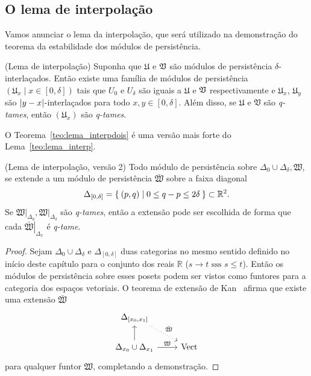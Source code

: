 \subsection{O lema de interpolação}

Vamos anunciar o lema da interpolação, que será utilizado na 
demonstração do teorema da estabilidade dos módulos de persistência.

\begin{lem}{(Lema de interpolação)}\label{teo:lema_interp}
Suponha que $\mathfrak{U}$ e $\mathfrak{V}$ são módulos de persistência
$\delta$-interlaçados. Então existe uma família de módulos de 
persistência $(\mathfrak{U}_x \mid x \in [0,\delta])$ tais que 
$U_0$ e $U_\delta$ são iguais a $\mathfrak{U}$ e $\mathfrak{V}$ 
respectivamente e $\mathfrak{U}_x$, $\mathfrak{U}_y$ são 
$\left\lvert y-x\right\rvert$-interlaçados para todo $x,y \in [0,\delta]$. Além disso,
se $\mathfrak{U}$ e $\mathfrak{V}$ são \textit{q-tames}, então 
$(\mathfrak{U}_x)$ são \textit{q-tames}.
\end{lem}

O Teorema~\ref{teo:lema_interpdois} é uma versão mais forte do 
Lema~\ref{teo:lema_interp}. 
\begin{teo}{(Lema de interpolação, versão 2)}\label{teo:lema_interpdois}
Todo módulo de persistência sobre $\Delta_0 \cup 
\Delta_\delta, \mathfrak{W}$, se extende a um módulo de persistência 
$\bar{\mathfrak{W}}$ sobre a faixa diagonal
\begin{equation*}
    \Delta_{[0, \delta]} = \Set{(p,q) | 0 \leq q - p \leq 2\delta}
    \subset \mathbb{R}^2.
\end{equation*} 
Se $\left.\mathfrak{W}\right|_{\Delta_0}, \left.\mathfrak{W}
\right|_{\Delta_\delta}$ são \textit{q-tames}, então a extensão
pode ser escolhida de forma que cada $\left.\bar{\mathfrak{W}}
\right|_{\Delta_x}$ é \textit{q-tame}. 
\end{teo}
\begin{proof}
    Sejam $\Delta_0 \cup \Delta_\delta$ e $\Delta_{[0,\delta]}$ duas 
    categorias no mesmo sentido definido no início deste capítulo para
    o conjunto dos reais $\mathbb{R}$ ($s \to t \text{ sss } s \leq t$).
    Então os módulos de persistência sobre esses posets podem ser vistos
    como funtores para a categoria dos espaços vetoriais. O teorema
    de extensão de Kan~\cite{MacLane1978} afirma que existe uma extensão
    $\bar{\mathfrak{W}}$ 
    \begin{equation*}
        \begin{tikzcd}
            {\Delta_{[x_0,x_1]}} \arrow[dotted]{rd}{\bar{\mathfrak{W}}}     &             \\
            \Delta_{x_0} \cup \Delta_{x_1} \arrow{u} \arrow{r}{\mathfrak{W}}  & \text{Vect}
        \end{tikzcd}
    \end{equation*}
    para qualquer funtor $\mathfrak{W}$, completando
    a demonstração. 
\end{proof}

